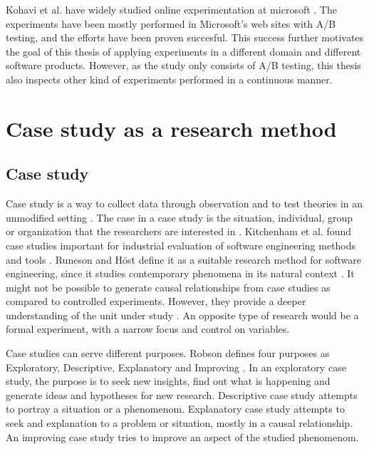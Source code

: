 \documentclass[english]{tktltiki2}
\theoremstyle{definition}
\theoremstyle{remark}
\begin{document}
Kohavi et al. have widely studied online experimentation at microsoft \cite{kohavi2009online}. The experiments have been mostly performed in Microsoft's web sites with A/B testing, and the efforts have been proven succesful. This success further motivates the goal of this thesis of applying experiments in a different domain and different software products. However, as the study only consists of A/B testing, this thesis also inspects other kind of experiments performed in a continuous manner.

\section{Case study as a research method}

\subsection{Case study}
Case study is a way to collect data through observation and to test theories in an unmodified setting \cite{zelkowitz1998experimental}. The case in a case study is the situation, individual, group or organization that the researchers are interested in \cite{robson2002real}. Kitchenham et al. found case studies important for industrial evaluation of software engineering methods and tools \cite{kitchenham1995case}. Runeson and Höst define it as a suitable research method for software engineering, since it studies contemporary phenomena in its natural context \cite{runeson2009guidelines}. It might not be possible to generate causal relationships from case studies as compared to controlled experiments. However, they provide a deeper understanding of the unit under study \cite{runeson2009guidelines}. An opposite type of research would be a formal experiment, with a narrow focus and control on variables. 

Case studies can serve different purposes. Robson defines four purposes as Exploratory, Descriptive, Explanatory and Improving \cite{robson2002real}. In an exploratory case study, the purpose is to seek new insights, find out what is happening and generate ideas and hypotheses for new research. Descriptive case study attempts to portray a situation or a phenomenom. Explanatory case study attempts to seek and explanation to a problem or situation, mostly in a causal relationship. An improving case study tries to improve an aspect of the studied phenomenom.  
\end{document}
